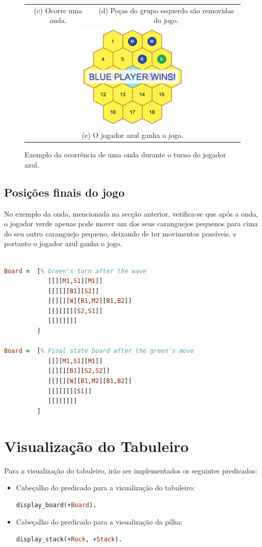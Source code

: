 \documentclass[a4paper]{article}
\begin{document}
\begin{figure}
\begin{tabular}{cc}
(c) Ocorre uma onda. & (d) Peças do grupo esquerdo são removidas do jogo. \\[6pt]
\multicolumn{2}{c}{\includegraphics[width=55mm]{end_game.png} }\\
\multicolumn{2}{c}{(e) O jogador azul ganha o jogo.}
\end{tabular}
\caption{Exemplo da ocorrência de uma onda durante o turno do jogador azul.}
\label{fig:intermedia}
\end{figure}

\newpage

\subsection{Posições finais do jogo}

No exemplo da onda, mencionada na secção anterior, verifica-se que após a onda, o jogador verde apenas pode mover um dos seus caranguejos pequenos para cima do seu outro caranguejo pequeno, deixando de ter movimentos possíveis, e portanto o jogador azul ganha o jogo.
\begin{lstlisting}[language=Prolog]

Board =  [% Green's turn after the wave
    	 	[[][M1,S1][M1]]
         	[[][][B1][S2]]
         	[[][][W][B1,M2][B1,B2]]
    	 	[[][][][S2,S1]]
    	 	[[][][]]
     	 ]
         
Board =  [% Final state board after the green's move
    	 	[[][M1,S1][M1]]
         	[[][][B1][S2,S2]]
         	[[][][W][B1,M2][B1,B2]]
    	 	[[][][][S1]]
    	 	[[][][]]
     	 ]
\end{lstlisting}

\section{Visualização do Tabuleiro} 

Para a visualização do tabuleiro, irão ser implementados os seguintes predicados:
\begin{itemize}
\item Cabeçalho do predicado para a visualização do tabuleiro:
\begin{lstlisting}[language=Prolog]
display_board(+Board).
\end{lstlisting}
\item Cabeçalho do predicado para a visualização da pilha:
\begin{lstlisting}[language=Prolog]
display_stack(+Rock, +Stack).
\end{lstlisting}
\end{itemize}
\end{document}
